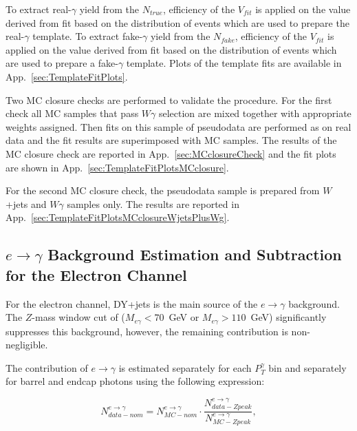 To extract real-$\gamma$ yield from the $N_{true}$, efficiency of the $V_{fit}$ is applied on the value derived from fit based on the distribution of events which are used to prepare the real-$\gamma$ template. To extract fake-$\gamma$ yield from the $N_{fake}$, efficiency of the $V_{fit}$ is applied on the value derived from fit based on the distribution of events which are used to prepare a fake-$\gamma$ template. Plots of the template fits are available in App.~\ref{sec:TemplateFitPlots}. 

Two MC closure checks are performed to validate the procedure. For the first check all MC samples that pass $W\gamma$ selection are mixed together with appropriate weights assigned. Then fits on this sample of pseudodata are performed as on real data and the fit results are superimposed with MC samples. The results of the MC closure check are reported in App.~\ref{sec:MCclosureCheck} and the fit plots are shown in App.~\ref{sec:TemplateFitPlotsMCclosure}. 

For the second MC closure check, the pseudodata sample is prepared from $W$+jets and $W\gamma$ samples only. The results are reported in App.~\ref{sec:TemplateFitPlotsMCclosureWjetsPlusWg}. 

\subsection{$e\rightarrow\gamma$ Background Estimation and Subtraction for the Electron Channel}
\label{sec:BackgroundSubtraction_etog}

For the electron channel, DY+jets is the main source of the $e \rightarrow \gamma$ background. The $Z$-mass window cut of ($M_{e\gamma}<70$~GeV or $M_{e\gamma}>110$~GeV) significantly suppresses this background, however, the remaining contribution is non-negligible. 

The contribution of $e\rightarrow\gamma$ is estimated separately for each $P_{T}^{\gamma}$ bin and separately for barrel and endcap photons using the following expression: 

\begin{equation}
N_{data-nom}^{e\rightarrow\gamma} = N_{MC-nom}^{e\rightarrow\gamma} \cdot \frac{N_{data-Zpeak}^{e\rightarrow\gamma}}{N_{MC-Zpeak}^{e\rightarrow\gamma}}, 
\end{equation}

